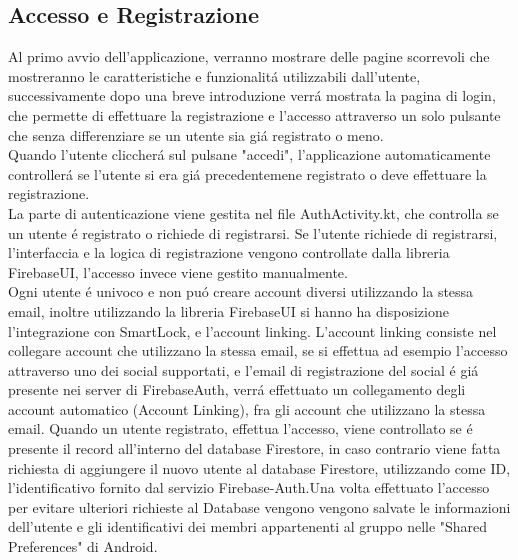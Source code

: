 \subsection{Accesso e Registrazione}
Al primo avvio dell'applicazione, verranno mostrare delle pagine scorrevoli che mostreranno le caratteristiche e funzionalit\'a utilizzabili dall'utente, successivamente dopo una breve introduzione verr\'a mostrata la pagina di login, che permette di effettuare la registrazione e l'accesso attraverso un solo pulsante che senza differenziare se un utente sia gi\'a registrato o meno.\\
Quando l'utente cliccher\'a sul pulsane "accedi", l'applicazione automaticamente controller\'a se l'utente si era gi\'a precedentemene registrato o deve effettuare la registrazione.\\

La parte di autenticazione viene gestita nel file AuthActivity.kt, che controlla se un utente \'e registrato o richiede di registrarsi.
Se l'utente richiede di registrarsi, l'interfaccia e la logica di registrazione vengono controllate dalla libreria FirebaseUI, l'accesso invece viene gestito manualmente.\\
Ogni utente \'e univoco e non pu\'o creare account diversi utilizzando la stessa email, inoltre utilizzando la libreria FirebaseUI si hanno ha disposizione l'integrazione con SmartLock, e l'account linking.
L'account linking consiste nel collegare account che utilizzano la stessa email, se si effettua ad esempio l'accesso attraverso uno dei social supportati, e l'email di registrazione del social \'e gi\'a presente nei server di FirebaseAuth, verr\'a effettuato un collegamento degli account automatico (Account Linking), fra gli account che utilizzano la stessa email.
Quando un utente registrato, effettua l'accesso, viene controllato se \'e presente il record all'interno del database Firestore, in caso contrario viene fatta richiesta di aggiungere il nuovo utente al database Firestore, utilizzando come ID, l'identificativo fornito dal servizio Firebase-Auth.Una volta effettuato l'accesso per evitare ulteriori richieste al Database vengono vengono salvate le informazioni dell'utente e gli identificativi dei membri appartenenti al gruppo nelle "Shared Preferences" di Android.



